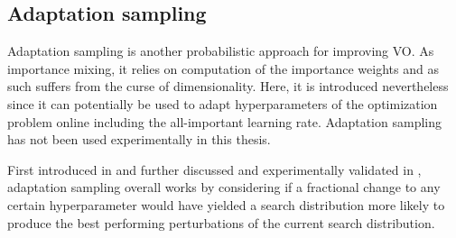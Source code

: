 \subsection{Adaptation sampling}\label{sec: Theory: Adaptation sampling}
Adaptation sampling is another probabilistic approach for improving \gls{VO}. As importance mixing, it relies on computation of the importance weights and as such suffers from the curse of dimensionality. Here, it is introduced nevertheless since it can potentially be used to adapt hyperparameters of the optimization problem online including the all-important learning rate. Adaptation sampling has not been used experimentally in this thesis.

First introduced in \cite{Schaul2011a} and further discussed and experimentally validated in \cite{Schaul2012}, adaptation sampling overall works by considering if a fractional change to any certain hyperparameter would have yielded a search distribution more likely to produce the best performing perturbations of the current search distribution. 

